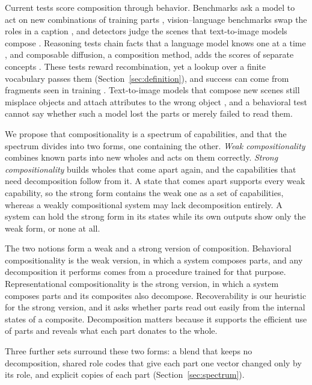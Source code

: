 \documentclass[10pt]{article}
\theoremstyle{plain}
\theoremstyle{remark}
\begin{document}
Current tests score composition through behavior. Benchmarks ask a model to act on new combinations of training parts \citep{lake2018,keysers2020,hupkes2020}, vision--language benchmarks swap the roles in a caption \citep{thrush2022winoground,yuksekgonul2023}, and detectors judge the scenes that text-to-image models compose \citep{ramesh2021,huang2023t2i}. Reasoning tests chain facts that a language model knows one at a time \citep{press2023}, and composable diffusion, a composition method, adds the scores of separate concepts \citep{liu2022composable}. These tests reward recombination, yet a lookup over a finite vocabulary passes them (Section~\ref{sec:definition}), and success can come from fragments seen in training \citep{dziri2023}. Text-to-image models that compose new scenes still misplace objects \citep{conwell2022} and attach attributes to the wrong object \citep{rassin2022}, and a behavioral test cannot say whether such a model lost the parts or merely failed to read them.

We propose that compositionality is a spectrum of capabilities, and that the spectrum divides into two forms, one containing the other. \emph{Weak compositionality} combines known parts into new wholes and acts on them correctly. \emph{Strong compositionality} builds wholes that come apart again, and the capabilities that need decomposition follow from it. A state that comes apart supports every weak capability, so the strong form contains the weak one as a set of capabilities, whereas a weakly compositional system may lack decomposition entirely. A system can hold the strong form in its states while its own outputs show only the weak form, or none at all.

The two notions form a weak and a strong version of composition. Behavioral compositionality is the weak version, in which a system composes parts, and any decomposition it performs comes from a procedure trained for that purpose. Representational compositionality is the strong version, in which a system composes parts and its composites also decompose. Recoverability is our heuristic for the strong version, and it asks whether parts read out easily from the internal states of a composite. Decomposition matters because it supports the efficient use of parts and reveals what each part donates to the whole.

Three further sets surround these two forms: a blend that keeps no decomposition, shared role codes that give each part one vector changed only by its role, and explicit copies of each part (Section~\ref{sec:spectrum}).
\end{document}
